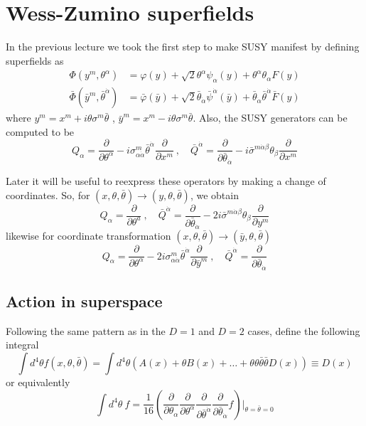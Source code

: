 \documentclass[a4paper,12pt]{article}
\numberwithin{equation}{section}
\numberwithin{exe}{section}
\newcommand{\p}{{\partial}}
\newcommand{\yb}{{\bar y}}
\renewcommand{\a}{{\alpha}}
\newcommand{\ad}{{\dot\alpha}}
\renewcommand{\b}{{\beta}}
\newcommand{\s}{{\sigma}}
\renewcommand{\sb}{{\bar\sigma}}
\renewcommand{\t}{{\theta}}
\newcommand{\tb}{{\bar\theta}}
\newcommand{\vphi}{{\varphi}}
\newcommand{\vphib}{{\bar\varphi}}
\newcommand{\Phib}{{\bar \Phi}}
\newcommand{\psib}{{\bar\psi}}
\begin{document}
\newpage

\section{Wess-Zumino superfields}

In the previous lecture we took the first step to make SUSY manifest by defining superfields as
	\begin{equation}
		\begin{aligned}
		\Phi(y^m,\t^\a) & = \vphi(y) + \sqrt2 \t^\a \psi_\a(y) + \t^\a \t_\a F(y) \\
		\Phib(\yb^m,\tb^\ad) & = \vphib(\yb) + \sqrt2 \tb_\ad \psib^\ad(\yb) + \tb_\ad \tb^\ad \bar F(y)
		\end{aligned}
	\end{equation}
where $y^m = x^m + i\t\s^m \tb$ , $\yb^m = x^m - i \t\s^m\tb$. Also, the SUSY generators can be computed to be
	\begin{equation}
	Q_\a = \frac{\p}{\p\t^\a}- i\s^m_{\a\ad} \tb^\ad \frac{\p}{\p x^m}\ ,\quad \bar Q^\ad = \frac{\p}{\p\tb_\ad} - i \sb^{m\ad\b}\t_\b \frac{\p}{\p x^m}
	\end{equation}

Later it will be useful to reexpress these operators by making a change of coordinates. So, for $(x,\t,\tb)\rightarrow (y,\t,\tb)$, we obtain
	\begin{equation}
	Q_\a = \frac{\p}{\p \t^a}\ ,\quad \bar Q^\ad = \frac{\p}{\p \tb_\ad} - 2i\sb^{m\ad\b} \t_\b \frac{\p}{\p y^m}
	\end{equation}
likewise for coordinate transformation $(x,\t,\tb)\rightarrow (\yb,\t,\tb)$
	\begin{equation}
	Q_\a = \frac{\p}{\p\t^\a} -2i\s^m_{\a\ad} \tb^\ad \frac{\p}{\p \yb^m}\ ,\quad \bar Q^\ad = \frac{\p}{\p\tb_\ad}
	\end{equation}

\subsection{Action in superspace}
Following the same pattern as in the $D=1$ and $D=2$ cases, define the following integral
	\begin{equation}
	\int d^4\t f(x,\t,\tb) = \int d^4\t \left(A(x) + \t B(x) + \ldots + \t\t\tb\tb D(x)\right) \equiv D(x)
	\end{equation}
or equivalently
	\begin{equation}
	\int d^4\t\ f = \frac{1}{16} \left( \frac{\p}{\p\t_\a}\frac{\p}{\p\t^\a}\frac{\p}{\p\tb^\ad}\frac{\p}{\p\tb_\ad} f \right)|_{\t = \tb = 0}
	\end{equation}
\end{document}
